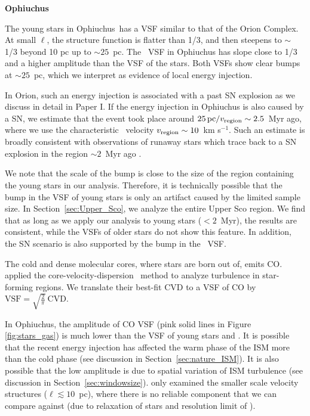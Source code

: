 \centerline{\textbf{Ophiuchus}}

The young stars in Ophiuchus~has a VSF similar to that of the Orion Complex. At small $\ell$, the structure function is flatter than 1/3, and then steepens to $\sim$ 1/3 beyond 10 pc up to $\sim 25$~pc. The \halpha~VSF in Ophiuchus has slope close to 1/3 and a higher amplitude than the VSF of the stars. Both VSFs show clear bumps at $\sim 25$~pc, which we interpret as evidence of local energy injection.

In Orion, such an energy injection is associated with a past SN explosion as we discuss in detail in Paper I. If the energy injection in Ophiuchus is also caused by a SN, we estimate that the event took place around $25\,\mathrm{pc} / v_{\rm region} \sim 2.5$~Myr ago, where we use the characteristic \halpha~velocity $v_{\rm region}\sim 10$~km s$^{-1}$. Such an estimate is broadly consistent with observations of runaway stars which trace back to a SN explosion in the region $\sim 2$~Myr ago \citep[][]{neuhauser_nearby_2020}. 

We note that the scale of the bump is close to the size of the region containing the young stars in our analysis. Therefore, it is technically possible that the bump in the VSF of young stars is only an artifact caused by the limited sample size. In Section~\ref{sec:Upper_Sco}, we analyze the entire Upper Sco region. We find that as long as we apply our analysis to young stars ($< 2$~Myr), the results are consistent, while the VSFs of older stars do not show this feature. In addition, the SN scenario is also supported by the bump in the \halpha~VSF.

The cold and dense molecular cores, where stars are born out of, emits CO. \citet{qian_new_2015,qian_studies_2018} applied the core-velocity-dispersion \citep[CVD;][]{qian_13co_2012}~method to analyze turbulence in star-forming regions. We translate their best-fit CVD to a VSF of CO by $\mathrm{VSF} = \sqrt{\frac{2}{\pi}}~\mathrm{CVD}$. 

In Ophiuchus, the amplitude of CO VSF (pink solid lines in Figure \ref{fig:stars_gas}) is much lower than the VSF of young stars and \halpha. It is possible that the recent energy injection has affected the warm phase of the ISM more than the cold phase (see discussion in Section~\ref{sec:nature_ISM}). It is also possible that the low amplitude is due to spatial variation of ISM turbulence (see discussion in Section~\ref{sec:windowsize}). \citet[][]{qian_new_2015} only examined the smaller scale velocity structures ($\ell \lesssim 10$~pc), where there is no reliable component that we can compare against (due to relaxation of stars and resolution limit of \halpha).

